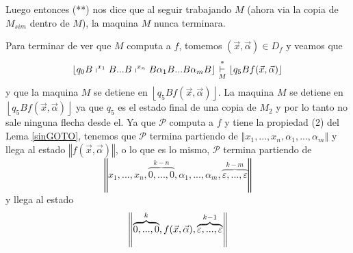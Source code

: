 \begin{frame}
  \begin{block}{}
    \PN Luego entonces (**) nos dice que al seguir trabajando $M$ (ahora via la
    copia de $M_{sim}$ dentro de $M$), la maquina $M$ nunca terminara.

    Para terminar de ver que $M$ computa a $f$, tomemos $(\vec{x},\vec{\alpha}%
    )\in D_{f}$ y veamos que%
    \begin{equation*}
    \left\lfloor q_{0}B\shortmid ^{x_{1}}B...B\shortmid ^{x_{n}}B\alpha
    _{1}B...B\alpha _{m}B\right\rfloor \overset{\ast }{\underset{M}{\vdash }}%
    \left\lfloor q_{5}Bf(\vec{x},\vec{\alpha})\right\rfloor
    \end{equation*}%
    y que la maquina $M$ se detiene en $\left\lfloor q_{5}Bf(\vec{x},\vec{\alpha}%
    )\right\rfloor $. La maquina $M$ se detiene en $\left\lfloor q_{5}Bf(\vec{x},%
    \vec{\alpha})\right\rfloor $ ya que $q_{5}$ es el estado final de una copia
    de $M_{2}$ y por lo tanto no sale ninguna flecha desde el. Ya que $\mathcal{P%
    }$ computa a $f$ y tiene la propiedad (2) del Lema \ref{sinGOTO}, tenemos
    que $\mathcal{P}$ termina partiendo de $\left\Vert x_{1},...,x_{n},\alpha
    _{1},...,\alpha _{m}\right\Vert $ y llega al estado $\left\Vert f(\vec{x},%
    \vec{\alpha})\right\Vert $, o lo que es lo mismo, $\mathcal{P}$ termina
    partiendo de%
    \begin{equation*}
    \left\Vert x_{1},...,x_{n},\overset{k-n}{\overbrace{0,...,0}},\alpha
    _{1},...,\alpha _{m},\overset{k-m}{\overbrace{\varepsilon ,...,\varepsilon }}%
    \right\Vert
    \end{equation*}%
    y llega al estado%
    \begin{equation*}
    \left\Vert \overset{k}{\overbrace{0,...,0}},f(\vec{x},\vec{\alpha}),\overset{%
    k-1}{\overbrace{\varepsilon ,...,\varepsilon }}\right\Vert
    \end{equation*}
  \end{block}
\end{frame}
